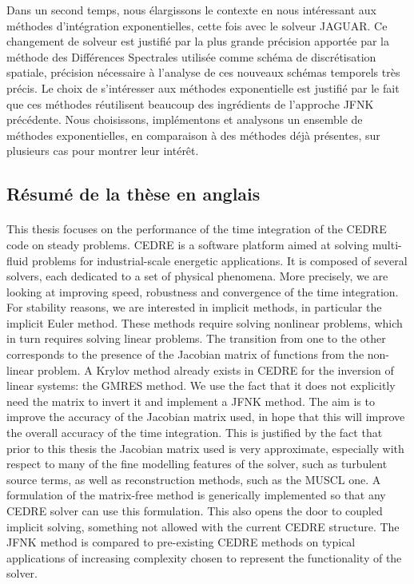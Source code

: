 Dans un second temps, nous élargissons le contexte en nous intéressant aux méthodes d'intégration exponentielles, cette fois avec le solveur JAGUAR.
Ce changement de solveur est justifié par la plus grande précision apportée par la méthode des Différences Spectrales utilisée comme schéma de discrétisation spatiale, précision nécessaire à l'analyse de ces nouveaux schémas temporels très précis.
Le choix de s'intéresser aux méthodes exponentielle est justifié par le fait que ces méthodes réutilisent beaucoup des ingrédients de l'approche JFNK précédente.
Nous choisissons, implémentons et analysons un ensemble de méthodes exponentielles, en comparaison à des méthodes déjà présentes, sur plusieurs cas pour montrer leur intérêt.


  \subsection{Résumé de la thèse en anglais}


    \paragraph{}
This thesis focuses on the performance of the time integration of the CEDRE code on steady problems.
CEDRE is a software platform aimed at solving multi-fluid problems for industrial-scale energetic applications.
It is composed of several solvers, each dedicated to a set of physical phenomena.
More precisely, we are looking at improving speed, robustness and convergence of the time integration.
For stability reasons, we are interested in implicit methods, in particular the implicit Euler method.
These methods require solving nonlinear problems, which in turn requires solving linear problems.
The transition from one to the other corresponds to the presence of the Jacobian matrix of functions from the non-linear problem.
A Krylov method already exists in CEDRE for the inversion of linear systems: the GMRES method.
We use the fact that it does not explicitly need the matrix to invert it and implement a JFNK method.
The aim is to improve the accuracy of the Jacobian matrix used, in hope that this will improve the overall accuracy of the time integration.
This is justified by the fact that prior to this thesis the Jacobian matrix used is very approximate, especially with respect to many of the fine modelling features of the solver, such as turbulent source terms, as well as reconstruction methods, such as the MUSCL one.
A formulation of the matrix-free method is generically implemented so that any CEDRE solver can use this formulation.
This also opens the door to coupled implicit solving, something not allowed with the current CEDRE structure.
The JFNK method is compared to pre-existing CEDRE methods on typical applications of increasing complexity chosen to represent the functionality of the solver.


